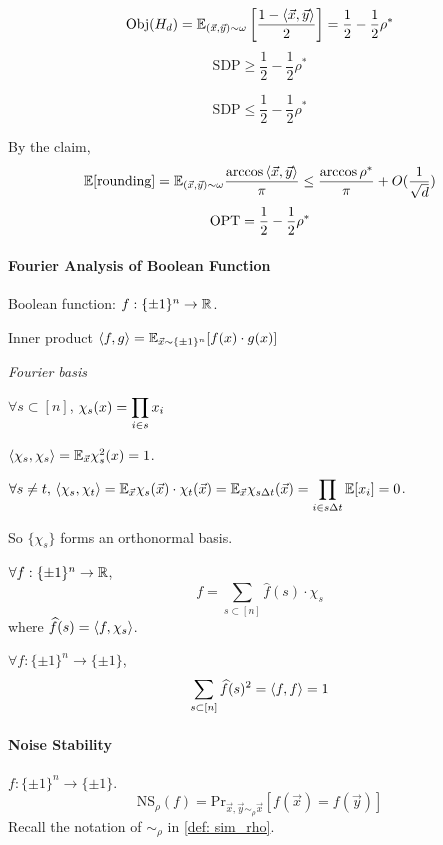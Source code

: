 \begin{fact}
    \[ \mathrm{Obj}(H_d)=\mathbb E_{(\vec{x},\vec{y})\sim \omega}\left[\frac{1-\left<\vec{x},\vec{y}\right>}{2}\right]=\frac{1}{2}-\frac{1}{2}\rho^* \]
    \[\mathrm{SDP} \geq \frac{1}{2}-\frac{1}{2}\rho^*\]
\end{fact}
\begin{claim}
    \[\mathrm{SDP} \leq \frac{1}{2}-\frac{1}{2}\rho^*\]
\end{claim}
By the claim, 
\[\mathbb E[\text{rounding}]=\mathbb E_{(\vec{x},\vec{y})\sim \omega}\frac{\arccos\left<\vec{x},\vec{y}\right>}{\pi} \leq \frac{\arccos\rho^*}{\pi}+O(\frac{1}{\sqrt{d}})\]
\[\mathrm{OPT}=\frac{1}{2}-\frac{1}{2}\rho^*\]

\paragraph{Fourier Analysis of Boolean Function}
Boolean function:  $ f:\{\pm 1\}^n\rightarrow \mathbb R $.

Inner product  $ \left<f,g\right>=\mathbb E_{\vec{x}\sim \{\pm 1\}^n}[f(x)\cdot g(x)] $ 

\textit{Fourier basis}  

$ \forall s\subset [n] $,  $ \chi_s(x)=\displaystyle\prod_{i\in s}x_i $  

$ \left<\chi_s,\chi_s\right>=\mathbb E_{\vec{x}}\chi_s^2(x)=1 $.

$ \displaystyle\forall s\neq t, \,\left<\chi_s,\chi_t\right>=\mathbb E_{\vec{x}}\chi_s(\vec{x})\cdot\chi_t(\vec{x})=\mathbb E_{\vec{x}}\chi_{s\Delta t}(\vec{x})=\prod_{i\in s\Delta t}\mathbb E[x_i]=0 $.

So  $ \{\chi_s\} $ forms an orthonormal basis.

\begin{proposition}
    $ \forall f:\{\pm 1\}^n\rightarrow \mathbb R $, 
    \[f=\sum_{s\subset [n]}\hat{f}(s)\cdot\chi_s\] 
    where  $ \widehat{f}(s)=\left<f,\chi_s\right> $. 
\end{proposition}

\begin{theorem}[Parseval's]
    $ \forall f: \{\pm 1\}^n\rightarrow \{\pm 1\}$,
    \[\sum_{s\subset [n]}\widehat{f}(s)^2=\left<f,f\right>=1\] 
\end{theorem}
\paragraph{Noise Stability}
 $ f:\{\pm 1\}^n\rightarrow \{\pm 1 \} $.
 \[\mathrm{NS}_\rho(f)=\mathrm{Pr}_{\vec{x},\vec{y}\sim_\rho \vec{x}}[f(\vec{x})=f(\vec{y})]\]
Recall the notation of  $ \sim_\rho $ in  \eqref{def: sim_rho}.

